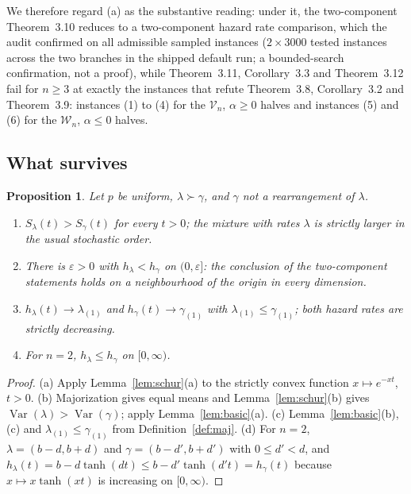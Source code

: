 \documentclass[10pt]{article}
\theoremstyle{plain}
\newtheorem{proposition}[theorem]{Proposition}
\theoremstyle{definition}
\theoremstyle{remark}
\DeclareMathOperator{\Var}{Var}
\begin{document}
We therefore regard (a) as the substantive reading: under it, the two-component Theorem~3.10 reduces to a two-component hazard rate comparison, which the audit confirmed on all admissible sampled instances ($2\times3000$ tested instances across the two branches in the shipped default run; a bounded-search confirmation, not a proof), while Theorem~3.11, Corollary~3.3 and Theorem~3.12 fail for $n\ge3$ at exactly the instances that refute Theorem~3.8, Corollary~3.2 and Theorem~3.9: instances (1) to (4) for the $\mathcal V_n$, $\alpha\ge0$ halves and instances (5) and (6) for the $\mathcal W_n$, $\alpha\le0$ halves.

\subsection{What survives}\label{sec:survives}

\begin{proposition}\label{prop:survives}
Let $p$ be uniform, $\lambda\succ\gamma$, and $\gamma$ not a rearrangement of $\lambda$.
\begin{enumerate}
\item[(a)] $S_\lambda(t)>S_\gamma(t)$ for every $t>0$; the mixture with rates $\lambda$ is strictly larger in the usual stochastic order.
\item[(b)] There is $\varepsilon>0$ with $h_\lambda<h_\gamma$ on $(0,\varepsilon]$: the conclusion of the two-component statements holds on a neighbourhood of the origin in every dimension.
\item[(c)] $h_\lambda(t)\to\lambda_{(1)}$ and $h_\gamma(t)\to\gamma_{(1)}$ with $\lambda_{(1)}\le\gamma_{(1)}$; both hazard rates are strictly decreasing.
\item[(d)] For $n=2$, $h_\lambda\le h_\gamma$ on $[0,\infty)$.
\end{enumerate}
\end{proposition}

\begin{proof}
(a) Apply Lemma~\ref{lem:schur}(a) to the strictly convex function $x\mapsto e^{-xt}$, $t>0$. (b) Majorization gives equal means and Lemma~\ref{lem:schur}(b) gives $\Var(\lambda)>\Var(\gamma)$; apply Lemma~\ref{lem:basic}(a). (c) Lemma~\ref{lem:basic}(b),(c) and $\lambda_{(1)}\le\gamma_{(1)}$ from Definition~\ref{def:maj}. (d) For $n=2$, $\lambda=(b-d,b+d)$ and $\gamma=(b-d',b+d')$ with $0\le d'<d$, and $h_\lambda(t)=b-d\tanh(dt)\le b-d'\tanh(d't)=h_\gamma(t)$ because $x\mapsto x\tanh(xt)$ is increasing on $[0,\infty)$.
\end{proof}
\end{document}

